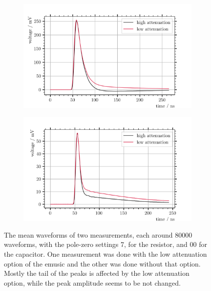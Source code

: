 \begin{figure}
	\centering
	\begin{subfigure}[b]{1.\textwidth}
		\centering
		\includegraphics[width=1.\textwidth]{pictures/att_pz331}
		\caption[]{}
		\label{fig:pz331_att}
	\end{subfigure}
	\begin{subfigure}[b]{1.\textwidth}
		\centering
		\includegraphics[width=1.\textwidth]{pictures/att_pz700}
		\caption[]{}
		\label{fig:pz700_att}
	\end{subfigure}
	\caption[Plot of the low attenuation effect with two pole-zero settings.]{The mean waveforms of two measurements, each around \num{80000} waveforms, with the pole-zero settings 7, for the resistor, and 00 for the capacitor. One measurement was done with the low attenuation option of the \ac{emusic} and the other was done without that option. Mostly the tail of the peaks is affected by the low attenuation option, while the peak amplitude seems to be not changed.}
	\label{fig:pz_att}
\end{figure}

